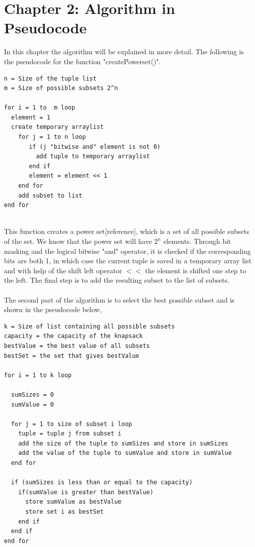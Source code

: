 \documentclass{article}
\begin{document}
\section*{Chapter 2: Algorithm in Pseudocode}
In this chapter the algorithm will be explained in more detail. The following is the pseudocode for the function "createPowerset()". \newline

\begin{verbatim}
n = Size of the tuple list 	
m = Size of possible subsets 2^n

for i = 1 to  m loop
  element = 1  
  create temporary arraylist  
    for j = 1 to n loop
       if (j "bitwise and" element is not 0)
         add tuple to temporary arraylist
       end if
       element = element << 1
    end for
    add subset to list
end for
 
\end{verbatim}

\noindent This function creates a power set[reference], which is a set of all possible subsets of the set. We know that the power set will have $2^n$ elements. Through bit masking and the logical bitwise "and" operator, it is checked if the corresponding bits are both 1, in which case the current tuple is saved in a temporary array list and with help of the shift left operator $<<$ the element is shifted one step to the left. The final step is to add the resulting subset to the list of subsets. \\ \\ 

The second part of the algorithm is to select the best possible subset and is shown in the pseudocode below,\\

\begin{verbatim}
k = Size of list containing all possible subsets
capacity = the capacity of the knapsack
bestValue = the best value of all subsets
bestSet = the set that gives bestValue

for i = 1 to k loop

  sumSizes = 0
  sumValue = 0

  for j = 1 to size of subset i loop
    tuple = tuple j from subset i
    add the size of the tuple to sumSizes and store in sumSizes
    add the value of the tuple to sumValue and store in sumValue
  end for

  if (sumSizes is less than or equal to the capacity)
    if(sumValue is greater than bestValue)
      store sumValue as bestValue
      store set i as bestSet
    end if
  end if
end for
\end{verbatim}
\end{document}

